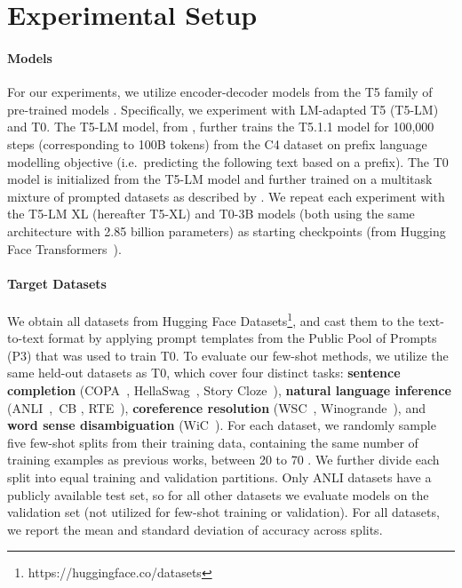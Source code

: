 \section{Experimental Setup}

\paragraph{Models}
For our experiments, we utilize encoder-decoder models from the T5 family of pre-trained models \cite{raffel2020t5}. Specifically, we experiment with LM-adapted T5 (T5-LM) and T0. The T5-LM model, from \citet{lester-etal-2021-power}, further trains the T5.1.1 model for 100,000 steps (corresponding to 100B tokens) from the C4 dataset on prefix language modelling objective (i.e.\ predicting the following text based on a prefix). The T0 model is initialized from the T5-LM model and further trained on a multitask mixture of prompted datasets as described by \citet{sanh2022multitask}.
We repeat each experiment with the T5-LM XL (hereafter T5-XL) and T0-3B models (both using the same architecture with 2.85 billion parameters) as starting checkpoints (from Hugging Face Transformers~\citep{wolf-etal-2020-transformers}).

\paragraph{Target Datasets}
We obtain all datasets from Hugging Face Datasets\footnote{https://huggingface.co/datasets}, and cast them to the text-to-text format by applying prompt templates from the Public Pool of Prompts (P3) \citep{bach-etal-2022-promptsource} that was used to train T0.
To evaluate our few-shot methods, we utilize the same held-out datasets as T0, which cover four distinct tasks: \textbf{sentence completion} (COPA~\citep{gordon-etal-2012-semeval}, HellaSwag~\citep{zellers-etal-2019-hellaswag}, Story Cloze~\citep{sharma-etal-2018-tackling}), \textbf{natural language inference} (ANLI~\citep{nie-etal-2020-adversarial},~CB \citep{Marneffe2019TheCI}, RTE~\citep{10.1007/11736790_9}), \textbf{coreference resolution} (WSC~\citep{levesque2012winograd}, Winogrande~\citep{winogrande}), and \textbf{word sense disambiguation} (WiC~\citep{pilehvar-camacho-collados-2019-wic}). For each dataset, we randomly sample five few-shot splits from their training data, containing the same number of training examples as previous works, between 20 to 70 \citep{NEURIPS2020_1457c0d6,liu2020tfew}. We further divide each split into equal training and validation partitions. Only ANLI datasets have a publicly available test set, so for all other datasets we evaluate models on the validation set (not utilized for few-shot training or validation). For all datasets, we report the mean and standard deviation of accuracy across splits.


